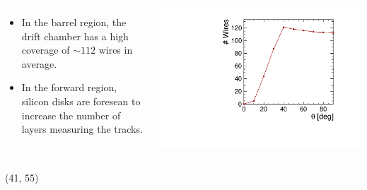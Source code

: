 \documentclass[final,xcolor={dvipsnames,svgnames,x11names,table}]{beamer}
\begin{document}
\begin{frame}
\begin{textblock}{40}
\begin{tcolorbox}[title=The simulation of the drift chamber \& coverage]
\begin{columns}
      \begin{itemize}
        \item In the barrel region, the drift chamber has a high coverage of $\sim 112$ wires in average.
        \item In the forward region, silicon disks are foresean to increase the number of layers measuring the tracks.
      \end{itemize}
      \centering
      \includegraphics[width=\textwidth]{Figures/numWires}
  \end{columns}

  \end{tcolorbox}
\end{textblock}


\begin{textblock}{40}(41, 55)
  \begin{tcolorbox}[title=Main sources of beam-induced backgrounds]


\end{tcolorbox}
\end{textblock}
\end{frame}
\end{document}
